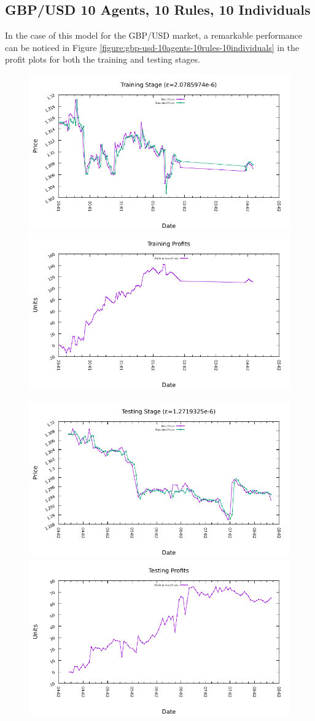 \newpage

\subsection{GBP/USD 10 Agents, 10 Rules, 10 Individuals}
\label{results:forecast-gbp-usd-10agents-10rules-10individuals}

In the case of this model for the GBP/USD market, a remarkable performance can
be noticed in Figure \ref{figure:gbp-usd-10agents-10rules-10individuals} in the
profit plots for both the training and testing stages.

\begin{figure}[htp]
  \centering

  \includegraphics[width=.45\textwidth]{img/plots/gbp_usd_h1-10agents-10rules-10ind-100gen_training_fit.pdf}\quad
  \includegraphics[width=.45\textwidth]{img/plots/gbp_usd_h1-10agents-10rules-10ind-100gen_training_profits.pdf}

  \medskip

  \includegraphics[width=.45\textwidth]{img/plots/gbp_usd_h1-10agents-10rules-10ind-100gen_testing_fit.pdf}\quad
  \includegraphics[width=.45\textwidth]{img/plots/gbp_usd_h1-10agents-10rules-10ind-100gen_testing_profits.pdf}


\end{figure}
